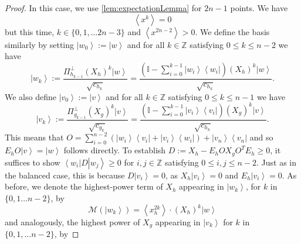 \documentclass{article}
\begin{document}
\begin{proof}
  In this case, we use \cref{lem:expectationLemma} for $2n-1$ points. We have
  \begin{equation}
    \left\langle x^{k}\right\rangle =0\label{eq:mochonf0unbalanced}
  \end{equation}
  but this time, $k\in\{0,1,\dots2n-3\}$ and
  $
    \left\langle x^{2n-2}\right\rangle >0.
  $
  We define the basis similarly by setting $\left|w_{0}\right\rangle :=\left|w\right\rangle $
  and for all $k\in\mathbb{Z}$ satisfying $0\le k\le n-2$ we have
  \begin{displaymath}
    \left|w_{k}\right\rangle :=\frac{\Pi_{h_{k-1}}^{\perp}(X_{h})^{k}\left|w\right\rangle }{\sqrt{c_{h_{k}}}}=\frac{\left(\mathbb{I}-\sum_{i=0}^{k-1}\left|w_{i}\right\rangle \left\langle w_{i}\right|\right)(X_{h})^{k}\left|w\right\rangle }{\sqrt{c_{h_{k}}}}.
  \end{displaymath}
  We also define $\left|v_{0}\right\rangle :=\left|v\right\rangle $ and
  for all $k\in\mathbb{Z}$ satisfying  $0\le k\le n-1$ we have
  \begin{displaymath}
    \left|v_{k}\right\rangle :=\frac{\Pi_{g_{k-1}}^{\perp}(X_{g})^{k}\left|v\right\rangle }{\sqrt{c_{g_{k}}}}=\frac{\left(\mathbb{I}-\sum_{i=0}^{k-1}\left|v_{i}\right\rangle \left\langle v_{i}\right|\right)(X_{g})^{k}\left|v\right\rangle }{\sqrt{c_{h_{k}}}}.
  \end{displaymath}
  This means that $O=\sum_{i=0}^{n-2}\left(\left|w_{i}\right\rangle \left\langle v_{i}\right|+\left|v_{i}\right\rangle \left\langle w_{i}\right|\right)+\left|v_{n}\right\rangle \left\langle v_{n}\right|$
  and so $E_{h}O\left|v\right\rangle =\left|w\right\rangle $ follows
  directly. To establish $D:=X_{h}-E_{h}OX_{g}O^{T}E_{h}\ge0$,
  it suffices to show $\left\langle w_{i}\right|D\left|w_{j}\right\rangle \ge0$ for
  $i,j\in\mathbb{Z}$ satisfying $0\le i,j\le n-2$. Just as in the balanced case, this is because $D\left|v_{i}\right\rangle =0$, as
  $X_{h}\left|v_{i}\right\rangle =0$ and $E_{h}\left|v_{i}\right\rangle =0$.
  As before, we denote the highest-power term of $X_{h}$
  appearing in $\left|w_{k}\right\rangle $, for $k$ in $\{0,1\dots n-2\}$,
  by
  \begin{displaymath}
    \mathcal{M}(\left|w_{k}\right\rangle )=\left\langle x_{h}^{2k}\right\rangle \cdot(X_{h})^{k}\left|w\right\rangle
  \end{displaymath}
  and analogously, the highest power of $X_{g}$ appearing in $\left|v_{k}\right\rangle $
  for $k$ in $\{0,1,\dots n-2\}$, by

\end{proof}
\end{document}
